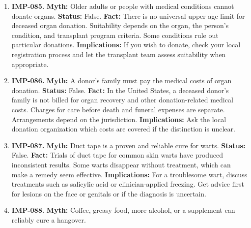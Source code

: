 \documentclass[11pt,oneside]{book}
\begin{document}
\begin{enumerate}[leftmargin=0pt,labelwidth=0pt,labelsep=0pt,itemindent=0pt]
\textbf{Status:} False.\newline
\textbf{Fact:} The treating team's first responsibility is to save the patient's life. In deceased organ donation, decisions about the patient's care and the determination of death are separate from organ recovery. \cite{ref427}\newline
\textbf{Implications:} You can document donation preferences without changing the emergency treatment you should receive.
\item[] \textbf{IMP-085.} \textbf{Myth:} Older adults or people with medical conditions cannot donate organs.\newline
\textbf{Status:} False.\newline
\textbf{Fact:} There is no universal upper age limit for deceased organ donation. Suitability depends on the organ, the person's condition, and transplant program criteria. Some conditions rule out particular donations. \cite{ref427}\newline
\textbf{Implications:} If you wish to donate, check your local registration process and let the transplant team assess suitability when appropriate.
\item[] \textbf{IMP-086.} \textbf{Myth:} A donor's family must pay the medical costs of organ donation.\newline
\textbf{Status:} False.\newline
\textbf{Fact:} In the United States, a deceased donor's family is not billed for organ recovery and other donation-related medical costs. Charges for care before death and funeral expenses are separate. Arrangements depend on the jurisdiction. \cite{ref427}\newline
\textbf{Implications:} Ask the local donation organization which costs are covered if the distinction is unclear.
\item[] \textbf{IMP-087.} \textbf{Myth:} Duct tape is a proven and reliable cure for warts.\newline
\textbf{Status:} False.\newline
\textbf{Fact:} Trials of duct tape for common skin warts have produced inconsistent results. Some warts disappear without treatment, which can make a remedy seem effective. \cite{ref284}\newline
\textbf{Implications:} For a troublesome wart, discuss treatments such as salicylic acid or clinician-applied freezing. Get advice first for lesions on the face or genitals or if the diagnosis is uncertain.
\item[] \textbf{IMP-088.} \textbf{Myth:} Coffee, greasy food, more alcohol, or a supplement can reliably cure a hangover.\newline

\end{enumerate}
\end{document}
